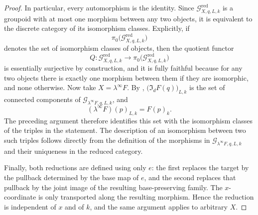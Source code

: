 \documentclass[10pt,a4paper]{amsart}
\begin{document}
\begin{proof}
  In particular, every automorphism is the identity. Since
  \(\mathcal{G}^{\mathrm{red}}_{X,q,L,k}\) is a groupoid with at most one
  morphism between any two objects, it is equivalent to the discrete category
  of its isomorphism classes. Explicitly, if
  \[
    \pi_0\bigl(\mathcal{G}^{\mathrm{red}}_{X,q,L,k}\bigr)
  \]
  denotes the set of isomorphism classes of objects, then the quotient functor
  \[
    Q:
    \mathcal{G}^{\mathrm{red}}_{X,q,L,k}\longrightarrow
    \pi_0\bigl(\mathcal{G}^{\mathrm{red}}_{X,q,L,k}\bigr)
  \]
  is essentially surjective by construction, and it is fully faithful because
  for any two objects there is exactly one morphism between them if they are
  isomorphic, and none otherwise.
  Now take \(X=\lambda^\infty F\). By
  ,
  \(\bigl(\mathfrak{I}_{d}F(q)\bigr)_{L,k}\) is the set of connected
  components of \(\mathcal{G}_{\lambda^\infty F,q,L,k}\), and
  \[
    (\lambda^\infty F)(p)_{L,k}=F(p)_k.
  \]
  The preceding argument therefore identifies this set with the isomorphism
  classes of the triples in the statement. The description of an isomorphism
  between two such triples follows directly from the definition of the
  morphisms in \(\mathcal{G}_{\lambda^\infty F,q,L,k}\) and their uniqueness
  in the reduced category.

  Finally, both reductions are defined using only \(e\): the first replaces
  the target by the pullback determined by the base map of \(e\), and the
  second replaces that pullback by the joint image of the resulting
  base-preserving family. The \(x\)-coordinate is only transported along the
  resulting morphism. Hence the reduction is independent of \(x\) and of
  \(k\), and the same argument applies to arbitrary \(X\).
\end{proof}
\end{document}
